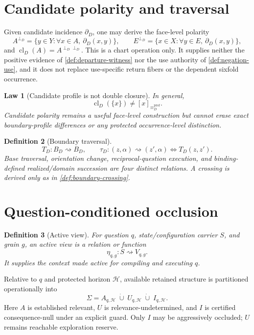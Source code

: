 \documentclass[11pt,oneside]{article}
\newtheorem{definition}{Definition}[section]
\newtheorem{law}[definition]{Law}
\begin{document}
\section{Candidate polarity and traversal}

Given candidate incidence \(\partial_D\), one may derive the face-level polarity
\[
A^{\perp_D}=\{y\in Y:\forall x\in A,\ \partial_D(x,y)\},
\qquad
E^{\perp_D}=\{x\in X:\forall y\in E,\ \partial_D(x,y)\},
\]
and \(\operatorname{cl}_D(A)=A^{\perp_D\perp_D}\).  This is a chart operation only.  It supplies neither the positive evidence of \cref{def:departure-witness} nor the use authority of \cref{def:negation-use}, and it does not replace use-specific return fibers or the dependent sixfold occurrence.

\begin{law}[Candidate profile is not double closure]
In general,
\[
\operatorname{cl}_D(\{x\})
\neq
[x]_{\equiv_D^{\mathrm{prof}}}.
\]
Candidate polarity remains a useful face-level construction but cannot erase exact boundary-profile differences or any protected occurrence-level distinction.
\end{law}

\begin{definition}[Boundary traversal]
\[
T_D:B_D\rightsquigarrow B_D,
\qquad
\tau_D:(z,\alpha)\rightsquigarrow(z',\alpha)
\iff T_D(z,z').
\]
Base traversal, orientation change, reciprocal-question execution, and binding-defined realized/domain succession are four distinct relations.  A crossing is derived only as in \cref{def:boundary-crossing}.
\end{definition}

\section{Question-conditioned occlusion}

\begin{definition}[Active view]
For question \(q\), state/configuration carrier \(S\), and grain \(g\), an active view is a relation or function
\[
\boxed{
\eta_{q,g}:S\rightsquigarrow V_{q,g}.
}
\]
It supplies the context made active for compiling and executing \(q\).
\end{definition}

Relative to \(q\) and protected horizon \(\mathcal H\), available retained structure is partitioned operationally into
\[
\boxed{
\Sigma
=
A_{q,\mathcal H}
\;\dot\cup\;
U_{q,\mathcal H}
\;\dot\cup\;
I_{q,\mathcal H}.
}
\]
Here \(A\) is established relevant, \(U\) is relevance-undetermined, and \(I\) is certified consequence-null under an explicit guard.  Only \(I\) may be aggressively occluded; \(U\) remains reachable exploration reserve.
\end{document}
